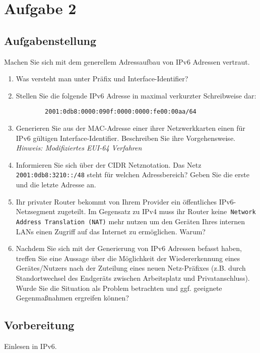 \newpage

\section{Aufgabe 2}

\subsection{Aufgabenstellung}
Machen Sie sich mit dem generellem Adressaufbau von IPv6 Adressen vertraut.
\begin{enumerate}[label=(\alph*)]
	\item Was versteht man unter Präfix und Interface-Identifier?
	\item  Stellen Sie die folgende IPv6 Adresse in maximal verkurzter Schreibweise dar:
\begin{lstlisting}
		2001:0db8:0000:090f:0000:0000:fe00:00aa/64
\end{lstlisting}
	\item Generieren Sie aus der MAC-Adresse einer ihrer Netzwerkkarten einen für IPv6 gültigen Interface-Identifier. Beschreiben Sie ihre Vorgehensweise.\\
	\textit{Hinweis: Modifiziertes EUI-64 Verfahren}
	\item  Informieren Sie sich über der CIDR Netznotation. Das Netz \texttt{2001:0db8:3210::/48} steht für welchen Adressbereich? Geben Sie die erste und die letzte Adresse an.
	\item Ihr privater Router bekommt von Ihrem Provider ein öffentliches IPv6-Netzsegment zugeteilt. Im Gegensatz zu IPv4 muss ihr Router keine\texttt{ Network Address Translation (NAT)} mehr nutzen um den Geräten Ihres internen LANs einen Zugriff auf das Internet zu ermöglichen. Warum?
	\item Nachdem Sie sich mit der Generierung von IPv6 Adressen befasst haben, treffen Sie eine Aussage über die Möglichkeit der Wiedererkennung eines Gerätes/Nutzers nach der Zuteilung eines neuen Netz-Präfixes (z.B. durch Standortwechsel des Endgeräts zwischen Arbeitsplatz und Privatanschluss). Wurde Sie die Situation als Problem betrachten und ggf. geeignete Gegenmaßnahmen ergreifen können?
\end{enumerate}

\subsection{Vorbereitung}
Einlesen in IPv6.


